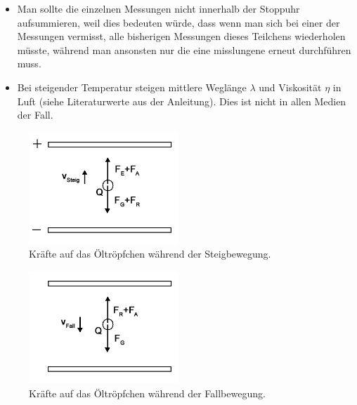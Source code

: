 \documentclass[
	a4paper,
	12pt,
	pagesize,
	ngerman
]{scrartcl}
\begin{document}
\begin{itemize}
		\item Man sollte die einzelnen Messungen nicht innerhalb der Stoppuhr aufsummieren, weil dies bedeuten würde, dass wenn man sich bei einer der Messungen vermisst, alle bisherigen Messungen dieses Teilchens wiederholen müsste, während man ansonsten nur die eine misslungene erneut durchführen muss.
		\item Bei steigender Temperatur steigen mittlere Weglänge $ \lambda $ und Viskosität $ \eta $ in Luft (siehe Literaturwerte aus der Anleitung). %
		Dies ist nicht in allen Medien der Fall.
	\end{itemize}
	\begin{figure}[H]
		\includegraphics[width=0.5\textwidth]{steig}
		\centering
		\caption{Kräfte auf das Öltröpfchen während der Steigbewegung.\cite{RCL}}
		\label{steig}
		\centering
	\end{figure} 
	\begin{figure}[H]
		\includegraphics[width=0.5\textwidth]{fall}
		\centering
		\caption{Kräfte auf das Öltröpfchen während der Fallbewegung.\cite{RCL}}
		\label{fall}
		\centering
	\end{figure} 
\end{document}
